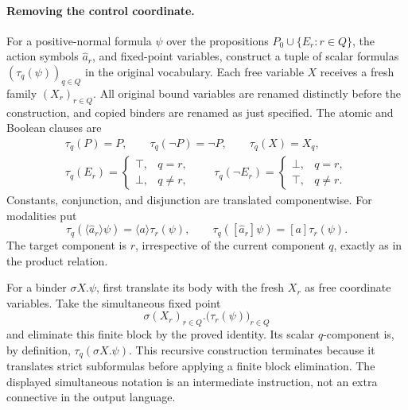\paragraph{Removing the control coordinate.}
For a positive-normal formula \(\psi\)
over the propositions \(P_0\cup\{E_r:r\in Q\}\),
the action symbols \(\widehat a_r\),
and fixed-point variables, construct a
tuple of scalar formulas
\((\tau_q(\psi))_{q\in Q}\)
in the original vocabulary.
Each free variable \(X\) receives
a fresh family \((X_r)_{r\in Q}\).
All original bound variables are
renamed distinctly before the
construction, and copied binders
are renamed as just specified.
The atomic and Boolean clauses are
\[
\begin{gathered}
 \tau_q(P)=P,\qquad
 \tau_q(\neg P)=\neg P,\qquad
 \tau_q(X)=X_q,\\
 \tau_q(E_r)=
   \begin{cases}\top,&q=r,\\\bot,&q\ne r,\end{cases}
 \qquad
 \tau_q(\neg E_r)=
   \begin{cases}\bot,&q=r,\\\top,&q\ne r.\end{cases}
\end{gathered}
\]
Constants, conjunction, and
disjunction are translated
componentwise. For modalities put
\[
 \tau_q(\langle\widehat a_r\rangle\psi)
     =\langle a\rangle\tau_r(\psi),
 \qquad
 \tau_q([\widehat a_r]\psi)
     =[a]\tau_r(\psi).
\]
The target component is \(r\),
irrespective of the current
component \(q\), exactly as in
the product relation.

For a binder \(\sigma X.\psi\),
first translate its body with
the fresh \(X_r\) as free
coordinate variables. Take the
simultaneous fixed point
\[
 \sigma(X_r)_{r\in Q}.
                 \bigl(\tau_r(\psi)\bigr)_{r\in Q}
\]
and eliminate this finite block
by the proved identity.
Its scalar \(q\)-component is,
by definition,
\(\tau_q(\sigma X.\psi)\).
This recursive construction
terminates because it translates
strict subformulas before applying
a finite block elimination.
The displayed simultaneous notation
is an intermediate instruction,
not an extra connective in the
output language.

